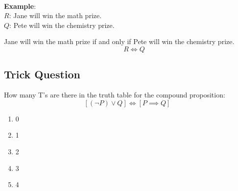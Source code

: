 \documentclass[11pt]{article}
\providecommand{\tightlist}{%
      \setlength{\itemsep}{0pt}\setlength{\parskip}{0pt}}
\begin{document}
    
    
    \begin{center}
    \end{center}
    { \hspace*{\fill} \\}
    
    \textbf{Example}:\\
\(R\): Jane will win the math prize.\\
\(Q\): Pete will win the chemistry prize.

Jane will win the math prize if and only if Pete will win the chemistry
prize. \[ \qquad R \iff Q\]

    \subsection{Trick Question}\label{trick-question}

    How many T's are there in the truth table for the compound proposition:
\[
[(\neg P) \lor Q] \iff [P \implies Q] 
\]

\begin{enumerate}
\def\labelenumi{\alph{enumi}.}
\tightlist
\item
  0\\
\item
  1\\
\item
  2\\
\item
  3\\
\item
  4
\end{enumerate}


    
    
    
    
\end{document}
